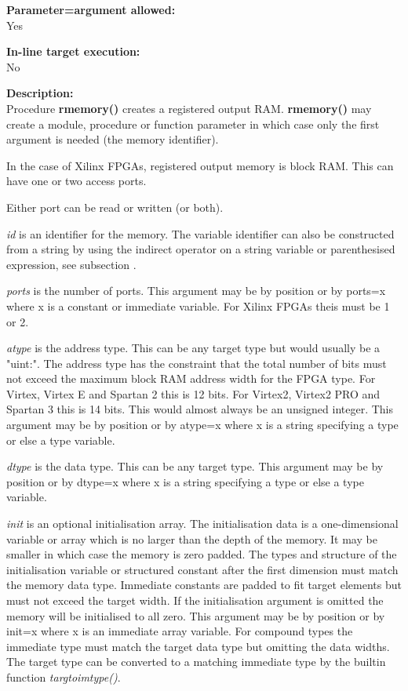         {\bf Parameter=argument allowed:} \\
        Yes
        
        {\bf In-line target execution:} \\
        No
        
        {\bf Description:} \\
        Procedure {\bf rmemory()} creates a registered output RAM.        
        {\bf rmemory()} may create a module, procedure or function
        parameter in which case only the first argument is needed (the memory
        identifier).

        In the case of Xilinx FPGAs, registered output memory is block RAM.
        This can have one or two access ports.

        Either port can be read or written (or both).
        
        {\em id} is an identifier for the memory. The variable identifier can
        also be constructed from a string by using the indirect operator on a
        string variable or parenthesised expression, see subsection
        .

        {\em ports} is the number of ports. This argument may be by position or
        by ports=x where x is a constant or immediate variable. For Xilinx FPGAs
        theis must be 1 or 2.

        {\em atype} is the address type. This can be any target type but would
        usually be a "uint:". The address type has the constraint that the total
        number of bits must not exceed the maximum block RAM address width for
        the FPGA type. For Virtex, Virtex E and Spartan 2 this is 12 bits. For
        Virtex2, Virtex2 PRO and Spartan 3 this is 14 bits. This would almost
        always be an unsigned integer. This argument may be by position or by
        atype=x where x is a string specifying a type or else a type variable.

        {\em dtype} is the data type. This can be any target type. This argument
        may be by position or by dtype=x where x is a string specifying a type
        or else a type variable.
        
        {\em init} is an optional initialisation array. The initialisation data
        is a one-dimensional variable or array which is no larger than the depth
        of the memory. It may be smaller in which case the memory is zero
        padded. The types and structure of the initialisation variable or
        structured constant after the first dimension must match the memory data
        type. Immediate constants are padded to fit target elements but must not
        exceed the target width. If the initialisation argument is omitted the
        memory will be initialised to all zero. This argument may be by position
        or by init=x where x is an immediate array variable. For compound types
        the immediate type must match the target data type but omitting the data
        widths. The target type can be converted to a matching immediate type
        by the builtin function {\em targtoimtype()}.
        
